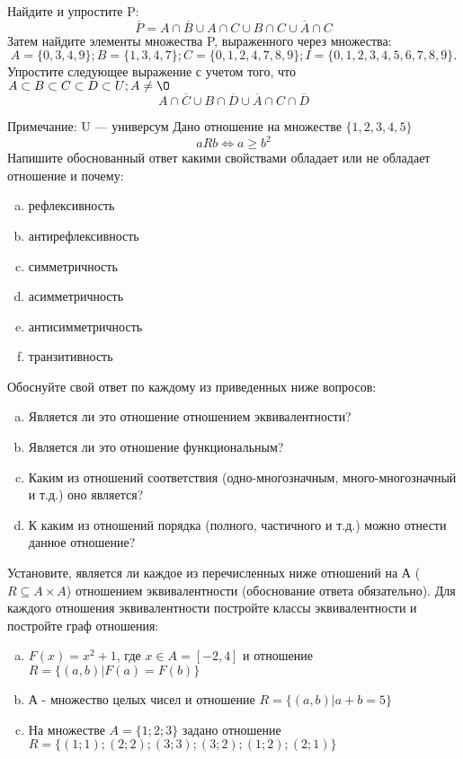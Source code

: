 \documentclass[10pt]{exam}
\begin{document}
\begin{questions}
\question
Найдите и упростите P:
\begin{equation*}
\overline{P} = A \cap \overline{B} \cup A \cap C \cup B \cap C \cup \overline{A} \cap C
\end{equation*}
Затем найдите элементы множества P, выраженного через множества:
\begin{equation*}
A = \{0, 3, 4, 9\}; 
B = \{1, 3, 4, 7\};
C = \{0, 1, 2, 4, 7, 8, 9\};
I = \{0, 1, 2, 3, 4, 5, 6, 7, 8, 9\}.
\end{equation*}\question
Упростите следующее выражение с учетом того, что $A\subset B \subset C \subset D \subset U; A \neq \O$
\begin{equation*}
A \cap  \overline{C} \cup B \cap \overline{D} \cup  \overline{A} \cap C \cap  \overline{D}
\end{equation*}

Примечание: U — универсум\question
Дано отношение на множестве $\{1, 2, 3, 4, 5\}$ 
\begin{equation*}
aRb \iff a \geq b^2
\end{equation*}
Напишите обоснованный ответ какими свойствами обладает или не обладает отношение и почему:   
\begin{enumerate} [a)]\setcounter{enumi}{0}
\item рефлексивность
\item антирефлексивность
\item симметричность
\item асимметричность
\item антисимметричность
\item транзитивность
\end{enumerate}

Обоснуйте свой ответ по каждому из приведенных ниже вопросов:
\begin{enumerate} [a)]\setcounter{enumi}{0}
    \item Является ли это отношение отношением эквивалентности?
    \item Является ли это отношение функциональным?
    \item Каким из отношений соответствия (одно-многозначным, много-многозначный и т.д.) оно является?
    \item К каким из отношений порядка (полного, частичного и т.д.) можно отнести данное отношение?
\end{enumerate}


\question
Установите, является ли каждое из перечисленных ниже отношений на А ($R \subseteq A \times A$) отношением эквивалентности (обоснование ответа обязательно). Для каждого отношения эквивалентности постройте классы эквивалентности и постройте граф отношения:
\begin{enumerate} [a)]\setcounter{enumi}{0}
\item $F(x)=x^{2}+1$, где $x \in A = [-2, 4]$ и отношение $R = \{(a,b)|F(a) = F(b)\}$
\item А - множество целых чисел и отношение $R = \{(a,b)|a + b = 5\}$
\item На множестве $A = \{1; 2; 3\}$ задано отношение $R = \{(1; 1); (2; 2); (3; 3); (3; 2); (1; 2); (2; 1)\}$


\end{enumerate}
\end{questions}
\end{document}
